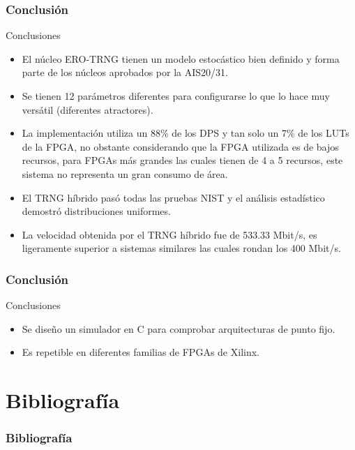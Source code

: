\documentclass[10pt]{beamer}
\begin{document}
\begin{frame}
    \frametitle{Conclusión}
    \begin{block}{Conclusiones}
        \justifying
        \begin{itemize}
        \item El núcleo ERO-TRNG tienen un modelo estocástico bien definido y forma parte de los núcleos aprobados por la AIS20/31.

        \item Se tienen 12 parámetros diferentes para configurarse lo que lo hace muy versátil (diferentes atractores).

        \item La implementación utiliza un 88\% de los DPS y tan solo un 7\% de los LUTs de la FPGA, no obstante considerando que la FPGA utilizada es de bajos recursos, para FPGAs más grandes las cuales tienen de 4 a 5 recursos, este sistema no representa un gran consumo de área.

        \item El TRNG híbrido pasó todas las pruebas NIST y el análisis estadístico demostró distribuciones uniformes.

        \item La velocidad obtenida por el TRNG híbrido fue de 533.33 Mbit/s, es ligeramente superior a sistemas similares las cuales rondan los 400 Mbit/s.

    \end{itemize}

	\end{block}
\end{frame}

\begin{frame}
    \frametitle{Conclusión}
    \begin{block}{Conclusiones}
        \justifying
        \begin{itemize}
        \item Se diseño un simulador en C para comprobar arquitecturas de punto fijo.
        \item Es repetible en diferentes familias de FPGAs de Xilinx.
    \end{itemize}

	\end{block}
\end{frame}




\section{Bibliografía}

\begin{frame}[t, allowframebreaks]
    \frametitle{Bibliografía}
	
	
\end{frame}
\end{document}
